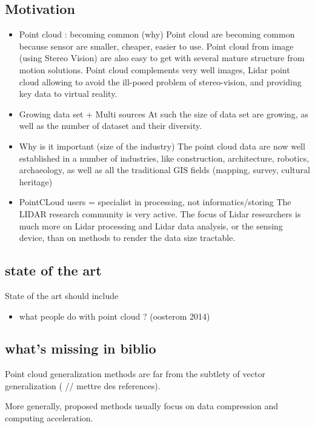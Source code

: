 	\subsection{Motivation}
		\begin{itemize}
			\item Point cloud : becoming common (why)
				Point cloud are becoming common because sensor are smaller, cheaper, easier to use. Point cloud from image (using Stereo Vision) are also easy to get with several mature structure from motion solutions.
				Point cloud complements very well images, Lidar point cloud allowing to avoid the ill-posed problem of stereo-vision, and providing key data to virtual reality.
			\item Growing data set + Multi sources 
				At such the size of data set are growing, as well as the number of dataset and their diversity.
			\item Why is it important (size of the industry) 
				The point cloud data are now well established in a number of industries, like construction, architecture, robotics, archaeology, as well as all the traditional GIS fields (mapping, survey, cultural heritage)
			\item PointCLoud users = specialist in processing, not informatics/storing 
				The LIDAR research community is very active. The focus of Lidar researchers is much more on Lidar processing and Lidar data analysis, or the sensing device, than on methods to render the data size tractable. 
		\end{itemize}   
		
	\subsection{state of the art}
		State of the art should include 
		\begin{itemize}
			\item what people do with point cloud ? (oosterom 2014)
		\end{itemize}
	\subsection{what's missing in biblio} 
		
		Point cloud generalization methods are far from the subtlety of vector generalization ( // mettre des references).
		
		More generally, proposed methods usually focus on data compression and computing acceleration.
		
